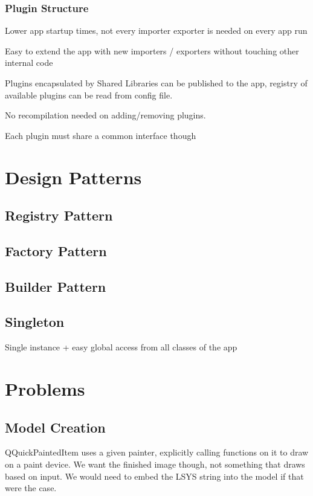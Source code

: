 \subsubsection{Plugin Structure}
Lower app startup times, not every importer exporter is needed on every app run

Easy to extend the app with new importers / exporters without touching other internal code

Plugins encapsulated by Shared Libraries can be published to the app, registry of available plugins can be read from config file.

No recompilation needed on adding/removing plugins.

Each plugin must share a common interface though

\section{Design Patterns}
\subsection{Registry Pattern}

\subsection{Factory Pattern}

\subsection{Builder Pattern}

\subsection{Singleton}
Single instance + easy global access from all classes of the app


\section{Problems}
\subsection{Model Creation}
QQuickPaintedItem uses a given painter, explicitly calling functions on it to draw on a paint device.
We want the finished image though, not something that draws based on input. We would need to embed the LSYS string into the model if that were the case.

